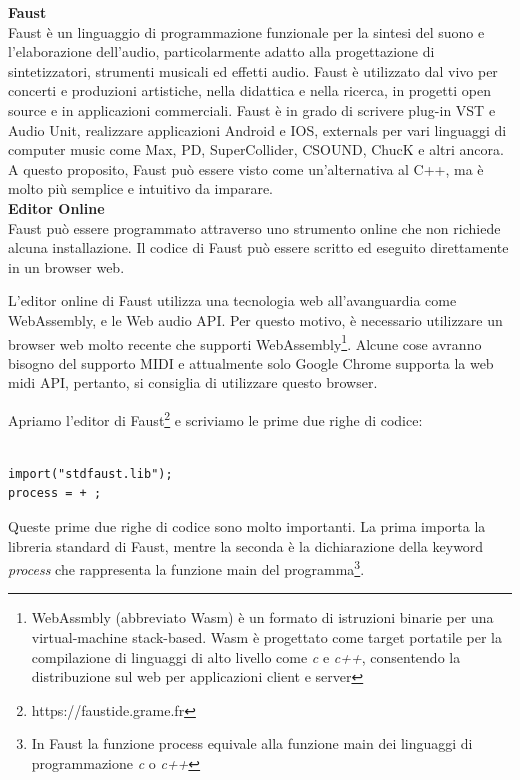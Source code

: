 \documentclass[11pt]{article}
\begin{document}
\begin{multicols*}{2}
\parskip=0pt

\textbf{Faust}\\

Faust è un linguaggio di programmazione funzionale per la sintesi del suono e l'elaborazione dell'audio, particolarmente adatto alla progettazione di sintetizzatori, strumenti musicali ed effetti audio. Faust è utilizzato dal vivo per concerti e produzioni artistiche, nella didattica e nella ricerca, in progetti open source e in applicazioni commerciali.
Faust è in grado di scrivere plug-in VST e Audio Unit, realizzare applicazioni Android e IOS, externals per vari linguaggi di computer music come Max, PD, SuperCollider, CSOUND, ChucK e altri ancora. A questo proposito, Faust può essere visto come un'alternativa al C++, ma è molto più semplice e intuitivo da imparare.\\

\textbf{Editor Online}\\

Faust può essere programmato attraverso uno strumento online che non richiede alcuna installazione. Il codice di Faust può essere scritto ed eseguito direttamente in un browser web.

L'editor online di Faust utilizza una tecnologia web all'avanguardia come WebAssembly, e le Web audio API. Per questo motivo, è necessario utilizzare un browser web molto recente che supporti WebAssembly\footnote{WebAssmbly (abbreviato Wasm) è un formato di istruzioni binarie per una virtual-machine stack-based. Wasm è progettato come target portatile per la compilazione di linguaggi di alto livello come \textit{c} e \textit{c++}, consentendo la distribuzione sul web per applicazioni client e server }. Alcune cose avranno bisogno del supporto MIDI e attualmente solo Google Chrome supporta la web midi API, pertanto, si consiglia di utilizzare questo browser.

Apriamo l'editor di Faust\footnote{https://faustide.grame.fr } e scriviamo le prime due righe di codice:

\begin{Verbatim}[fontsize=\footnotesize]

import("stdfaust.lib");
process = + ;

\end{Verbatim}

Queste prime due righe di codice sono molto importanti. La prima importa la libreria standard di Faust, mentre la seconda è la dichiarazione della keyword \textit{process} che rappresenta la funzione main del programma\footnote{In Faust la funzione process equivale alla funzione main dei linguaggi di programmazione \textit{c} o \textit{c++} }.


\end{multicols*}
\end{document}
